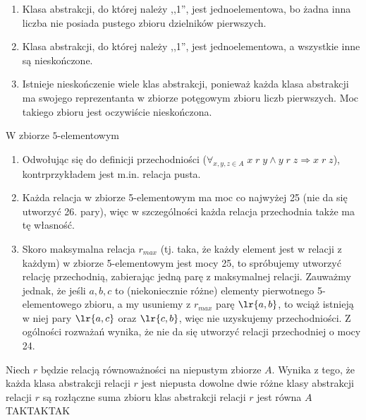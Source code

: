 \begin{solutions}
    \begin{enumerate}[\bf A.]
        \item Klasa abstrakcji, do której należy ,,1'', jest jednoelementowa, bo żadna inna liczba nie posiada pustego zbioru dzielników pierwszych.

        \item Klasa abstrakcji, do której należy ,,1'', jest jednoelementowa, a wszystkie inne są nieskończone.

        \item Istnieje nieskończenie wiele klas abstrakcji, ponieważ każda klasa abstrakcji ma swojego reprezentanta w zbiorze potęgowym zbioru liczb pierwszych. Moc takiego zbioru jest oczywiście nieskończona.
    \end{enumerate}

    \sol W zbiorze $5$-elementowym

    \begin{enumerate}[\bf A.]
        \item Odwołując się do definicji przechodniości ($\forall_{x, y, z \in A} \; x \; r \; y \land y \; r \; z \Rightarrow x \; r \; z$), kontrprzykładem jest m.in. relacja pusta.

        \item Każda relacja w zbiorze 5-elementowym ma moc co najwyżej 25 (nie da się utworzyć 26. pary), więc w szczególności każda relacja przechodnia także ma tę własność.

        \item Skoro maksymalna relacja $r_{max}$ (tj. taka, że każdy element jest w relacji z każdym) w zbiorze 5-elementowym jest mocy 25, to spróbujemy utworzyć relację przechodnią, zabierając jedną parę z maksymalnej relacji. Zauważmy jednak, że jeśli $a, b, c$ to (niekoniecznie różne) elementy pierwotnego 5-elementowego zbioru, a my usuniemy z $r_{max}$ parę $\lr{a, b}$, to wciąż istnieją w niej pary $\lr{a, c}$ oraz $\lr{c, b}$, więc nie uzyskujemy przechodniości. Z ogólności rozważań wynika, że nie da się utworzyć relacji przechodniej o mocy 24.
    \end{enumerate}

    \sol Niech $r$ będzie relacją równoważności na niepustym zbiorze $A$. Wynika z tego, że
    \answerss
    {każda klasa abstrakcji relacji $r$ jest niepusta}
    {dowolne dwie różne klasy abstrakcji relacji $r$ są rozłączne}
    {suma zbioru klas abstrakcji relacji $r$ jest równa $A$}
    {TAK}{TAK}{TAK}


\end{solutions}

